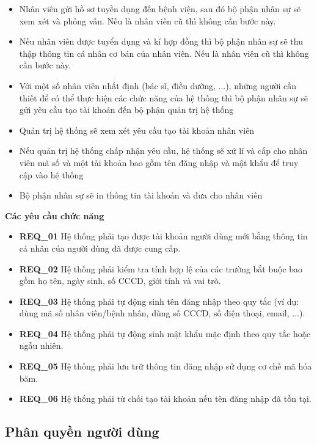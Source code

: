 \begin{itemize}
  \item Nhân viên gửi hồ sơ tuyền dụng đến bệnh viện, sau đó bộ phận nhân sự sẽ xem xét và phỏng vấn. Nếu là nhân viên cũ thì không cần bước này.
  \item Nếu nhân viên được tuyển dụng và kí hợp đồng thì bộ phận nhân sự sẽ thu thập thông tin cá nhân cơ bản của nhân viên. Nếu là nhân viên cũ thì không cần bước này.
  \item Với một số nhân viên nhất định (bác sĩ, điều dưỡng, ...), những người cần thiết để có thể thực hiện các chức năng của hệ thống thì bộ phận nhân sự sẽ gửi yêu cầu tạo tài khoản đến bộ phận quản trị hệ thống
  \item Quản trị hệ thống sẽ xem xét yêu cầu tạo tài khoản nhân viên
  \item Nếu quản trị hệ thống chấp nhận yêu cầu, hệ thống sẽ xử lí và cấp cho nhân viên mã số và một tài khoản bao gồm tên đăng nhập và mật khẩu để truy cập vào hệ thống
  \item Bộ phận nhân sự sẽ in thông tin tài khoản và đưa cho nhân viên
\end{itemize}

\noindent \textbf{Các yêu cầu chức năng}

\begin{itemize}
  \item \textbf{REQ\_01} Hệ thống phải tạo được tài khoản người dùng mới bằng thông tin cá nhân của người dùng đã được cung cấp.
  \item \textbf{REQ\_02} Hệ thống phải kiểm tra tính hợp lệ của các trường bắt buộc bao gồm họ tên, ngày sinh, số CCCD, giới tính và vai trò.
  \item \textbf{REQ\_03} Hệ thống phải tự động sinh tên đăng nhập theo quy tắc (ví dụ: dùng mã số nhân viên/bệnh nhân, dùng số CCCD, số điện thoại, email, ...).
  \item \textbf{REQ\_04} Hệ thống phải tự động sinh mật khẩu mặc định theo quy tắc hoặc ngẫu nhiên.
  \item \textbf{REQ\_05} Hệ thống phải lưu trữ thông tin đăng nhập sử dụng cơ chế mã hóa băm.
  \item \textbf{REQ\_06} Hệ thống phải từ chối tạo tài khoản nếu tên đăng nhập đã tồn tại.
\end{itemize}

\subsection{Phân quyền người dùng}

